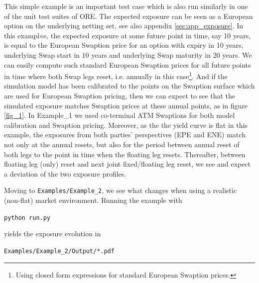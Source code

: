 \documentclass[12pt, a4paper]{article}
\begin{document}
This simple example is an important test case which is also run similarly in one of the unit test suites of ORE. The
expected exposure can be seen as a European option on the underlying netting set, see also appendix
\ref{sec:app_exposure}. In this exampl«e, the expected exposure at some future point in time, say 10 years, is equal to
the European Swaption price for an option with expiry in 10 years, underlying Swap start in 10 years and underlying Swap
maturity in 20 years. We can easily compute such standard European Swaption prices for all future points in time where
both Swap legs reset, i.e. annually in this case\footnote{Using closed form expressions for standard European Swaption
  prices.}. And if the simulation model has been calibrated to the points on the Swaption surface which are used for
European Swaption pricing, then we can expect to see that the simulated exposure matches Swaption prices at these annual
points, as in figure \ref{fig_1}.  In Example\_1 we used co-terminal ATM Swaptions for both model calibration and
Swaption pricing. Moreover, as the the yield curve is flat in this example, the exposures from both parties'
perspectives (EPE and ENE) match not only at the annual resets, but also for the period between annual reset of both
legs to the point in time when the floating leg resets. Thereafter, between floating leg (only) reset and next joint
fixed/floating leg reset, we see and expect a deviation of the two exposure profiles.

\medskip Moving to {\tt Examples/Example\_2}, we see what changes when using a realistic (non-flat) market
environment. Running the example with

\medskip
\centerline{\tt python run.py } 
\medskip

yields the exposure evolution in 

\medskip
\centerline{\tt Examples/Example\_2/Output/*.pdf } 
\medskip
\end{document}

